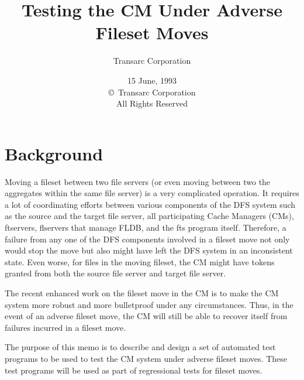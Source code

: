 %
%
%
%
%
%




\title{ Testing the CM Under Adverse Fileset Moves }
\author{Transarc Corporation} %
\date{15 June, 1993 \\
\copyright \number\year\ Transarc Corporation\\
All Rights Reserved}
\maketitle
\tableofcontents

\pagebreak
\section{Background}
\label{overviewref}

Moving a fileset between two file servers (or even moving between two the 
aggregates within the same file server)
is a very complicated operation. It requires a lot of coordinating efforts
between various components of the DFS system such as  
the source and the target file server, all participating Cache Managers (CMs), 
ftservers, flservers that manage FLDB, and the fts program itself. 
Therefore, a failure from any one of the DFS components involved 
in a fileset move not only would stop the move but also might have left the 
DFS system in an inconsistent state. Even worse, for files in the moving
fileset, the CM might have tokens granted from both the source 
file server and target file server. 

The recent enhanced work on the fileset move in the CM is to make the CM 
system more robust and more bulletproof under any circumstances.
Thus, in the event of an adverse fileset move, the CM will still be able to 
recover itself from failures incurred in a fileset move.

The purpose of this memo is to describe and design a set of automated test 
programs to be used to test the CM system under adverse fileset moves. 
These test programs will be used as part of regressional tests for fileset
moves. 

